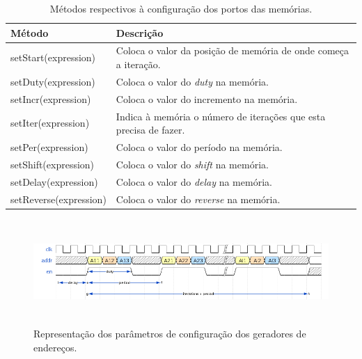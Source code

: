 \begin{table}[h!]
    \caption[Métodos respectivos à configuração dos portos das memórias.]{Métodos respectivos à configuração dos portos das memórias.}
  \begin{center}
    \begin{tabular}{|l|L{7cm}|}
      \hline
       {\bf Método} & {\bf Descrição} \\
      \hline \hline
      setStart(expression) & Coloca o valor da posição de memória de onde começa a iteração. \\
       setDuty(expression) & Coloca o valor do {\it duty} na memória. \\
      setIncr(expression) & Coloca o valor do incremento na memória. \\
       setIter(expression) & Indica à memória o número de iterações que esta precisa de fazer. \\
      setPer(expression) & Coloca o valor do período na memória. \\
       setShift(expression) & Coloca o valor do {\it shift} na memória. \\
      setDelay(expression) & Coloca o valor do {\it delay} na memória.  \\
      setReverse(expression) & Coloca o valor do {\it reverse} na memória. \\
     
      \hline
    \end{tabular}
  \end{center}
  \label{tab:instrMemConfig}
\end{table}




\begin{figure}[!htb]
  \centering
  \includegraphics[height=40mm, width=155mm]{Figures/scheme_memory_properties.png}
  \caption[Representação dos parâmetros de configuração dos geradores de endereços.]{Representação dos parâmetros de configuração dos geradores de endereços.}  
  \label{fig:Representacao_gerador_enderecos}
\end{figure}

